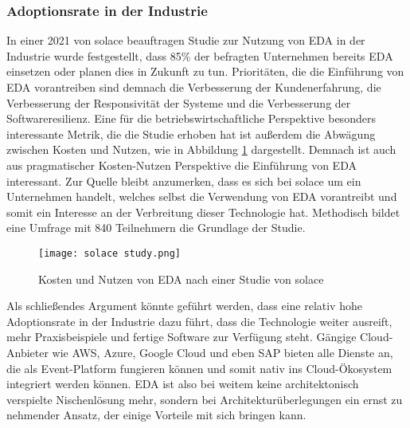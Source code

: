 \subsubsection*{Adoptionsrate in der Industrie}
In einer 2021 von solace beauftragen Studie zur Nutzung von \ac{EDA} in der Industrie wurde festgestellt, dass 85\% der befragten Unternehmen bereits \ac{EDA} einsetzen oder planen dies in Zukunft zu tun. Prioritäten, die die Einführung von \ac{EDA} vorantreiben sind demnach die Verbesserung der Kundenerfahrung, die Verbesserung der Responsivität der Systeme und die Verbesserung der Softwareresilienz. \cite[Vgl.][]{solace2021} Eine für die betriebswirtschaftliche Perspektive besonders interessante Metrik, die die Studie erhoben hat ist außerdem die Abwägung zwischen Kosten und Nutzen, wie in Abbildung \ref{solace} dargestellt. Demnach ist auch aus pragmatischer Kosten-Nutzen Perspektive die Einführung von \ac{EDA} interessant. Zur Quelle bleibt anzumerken, dass es sich bei solace um ein Unternehmen handelt, welches selbst die Verwendung von \ac{EDA} vorantreibt und somit ein Interesse an der Verbreitung dieser Technologie hat.  Methodisch bildet eine Umfrage mit 840 Teilnehmern die Grundlage der Studie.
\begin{figure}[H]
    \centering
    \texttt{[image: solace study.png]}
    \caption[Kosten Nutzen EDA]{Kosten und Nutzen von EDA nach einer Studie von solace \cite[Vgl.][]{solace2021}}
    \label{solace}
  \end{figure}
Als schließendes Argument könnte geführt werden, dass eine relativ hohe Adoptionsrate in der Industrie dazu führt, dass die Technologie weiter ausreift, mehr Praxisbeispiele und fertige Software zur Verfügung steht. Gängige Cloud-Anbieter wie AWS\cite[Vgl.][]{aws2023}, Azure\cite[Vgl.][]{azure2023}, Google Cloud \cite[Vgl.][]{gcp2021} und eben SAP bieten alle Dienste an, die als Event-Platform fungieren können und somit nativ ins Cloud-Ökosystem integriert werden können. \ac*{EDA} ist also bei weitem keine architektonisch verspielte Nischenlösung mehr, sondern bei Architekturüberlegungen ein ernst zu nehmender Ansatz, der einige Vorteile mit sich bringen kann. 